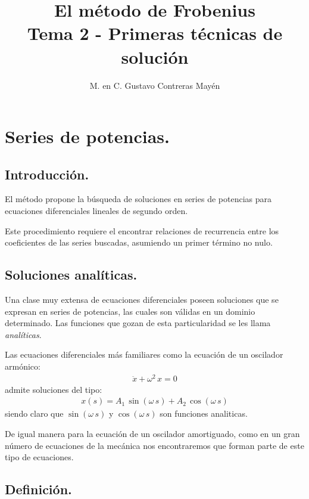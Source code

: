 \documentclass[12pt]{article}
\title{El método de Frobenius \\[0.3em]  \large{Tema 2 - Primeras técnicas de solución}\vspace{-3ex}}
\author{M. en C. Gustavo Contreras Mayén}
\date{ }
\numberwithin{equation}{section}
\begin{document}
\vspace{-4cm}
\maketitle
\fontsize{14}{14}\selectfont
\tableofcontents
\newpage

\section{Series de potencias.}
\subsection{Introducción.}

El método propone la búsqueda de soluciones en series de potencias para ecuaciones diferenciales lineales de segundo orden.
\par
Este procedimiento requiere el encontrar relaciones de recurrencia entre los coeficientes de las series buscadas, asumiendo un primer término no nulo.

\subsection{Soluciones analíticas.}

Una clase muy extensa de ecuaciones diferenciales poseen soluciones que se expresan en series de potencias, las cuales son válidas en un dominio determinado. Las funciones que gozan de esta particularidad se les llama \emph{analíticas}.
\par
Las ecuaciones diferenciales más familiares como la ecuación de un oscilador armónico:
\begin{align*}
\ddot{x} + \omega^{2} \, x = 0
\end{align*}
admite soluciones del tipo:
\begin{align*}
x (s) = A_{1} \, \sin( \omega \, s) + A_{2} \, \cos (\omega \, s)
\end{align*}
siendo claro que $\sin( \omega \, s)$ y $\cos( \omega \, s)$ son funciones analiticas.
\par
De igual manera para la ecuación de un oscilador amortiguado, como en un gran número de ecuaciones de la mecánica nos encontraremos que forman parte de este tipo de ecuaciones.

\subsection{Definición.}
\end{document}
